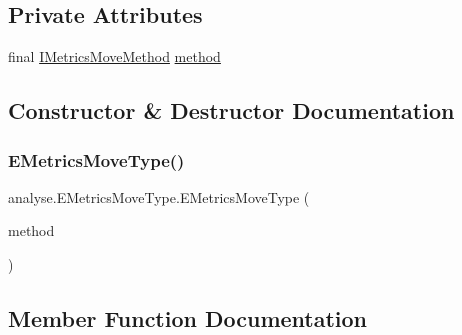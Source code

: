 \subsection*{Private Attributes}
\begin{DoxyCompactItemize}
\item 
final \mbox{\hyperlink{interfaceanalyse_1_1move_methods_1_1_i_metrics_move_method}{I\+Metrics\+Move\+Method}} \mbox{\hyperlink{enumanalyse_1_1_e_metrics_move_type_a003d08d23ab5a57a6736c1d1a13baa33}{method}}
\end{DoxyCompactItemize}


\subsection{Constructor \& Destructor Documentation}
\mbox{\label{enumanalyse_1_1_e_metrics_move_type_a9db417208cecac4b4e20d3adf4a18eec}} 
\subsubsection{\texorpdfstring{E\+Metrics\+Move\+Type()}{EMetricsMoveType()}}
{\footnotesize\ttfamily analyse.\+E\+Metrics\+Move\+Type.\+E\+Metrics\+Move\+Type (\begin{DoxyParamCaption}\item[{\mbox{\hyperlink{interfaceanalyse_1_1move_methods_1_1_i_metrics_move_method}{I\+Metrics\+Move\+Method}}}]{method }\end{DoxyParamCaption})\hspace{0.3cm}{\ttfamily [inline]}}



\subsection{Member Function Documentation}
\mbox{\label{enumanalyse_1_1_e_metrics_move_type_aa8970fab2a06f13d314f9fc790c24048}} 
